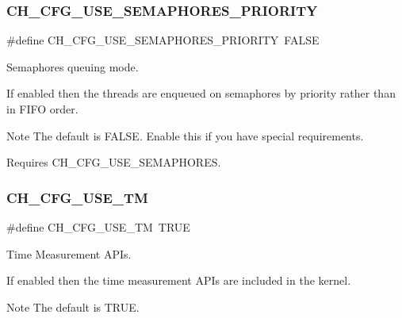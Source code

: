\subsubsection{\texorpdfstring{C\+H\+\_\+\+C\+F\+G\+\_\+\+U\+S\+E\+\_\+\+S\+E\+M\+A\+P\+H\+O\+R\+E\+S\+\_\+\+P\+R\+I\+O\+R\+I\+TY}{CH\_CFG\_USE\_SEMAPHORES\_PRIORITY}}
{\footnotesize\ttfamily \#define C\+H\+\_\+\+C\+F\+G\+\_\+\+U\+S\+E\+\_\+\+S\+E\+M\+A\+P\+H\+O\+R\+E\+S\+\_\+\+P\+R\+I\+O\+R\+I\+TY~F\+A\+L\+SE}



Semaphores queuing mode. 

If enabled then the threads are enqueued on semaphores by priority rather than in F\+I\+FO order.

\begin{DoxyNote}{Note}
The default is {\ttfamily F\+A\+L\+SE}. Enable this if you have special requirements. 

Requires {\ttfamily C\+H\+\_\+\+C\+F\+G\+\_\+\+U\+S\+E\+\_\+\+S\+E\+M\+A\+P\+H\+O\+R\+ES}. 
\end{DoxyNote}
\hypertarget{group__config_ga1bd0fe5d119a7de890025214ae249c1d}{}\label{group__config_ga1bd0fe5d119a7de890025214ae249c1d} 
\subsubsection{\texorpdfstring{C\+H\+\_\+\+C\+F\+G\+\_\+\+U\+S\+E\+\_\+\+TM}{CH\_CFG\_USE\_TM}}
{\footnotesize\ttfamily \#define C\+H\+\_\+\+C\+F\+G\+\_\+\+U\+S\+E\+\_\+\+TM~T\+R\+UE}



Time Measurement A\+P\+Is. 

If enabled then the time measurement A\+P\+Is are included in the kernel.

\begin{DoxyNote}{Note}
The default is {\ttfamily T\+R\+UE}. 
\end{DoxyNote}
\hypertarget{group__config_ga2e46052c737bba99ac4b45f834149fc4}{}\label{group__config_ga2e46052c737bba99ac4b45f834149fc4} 
